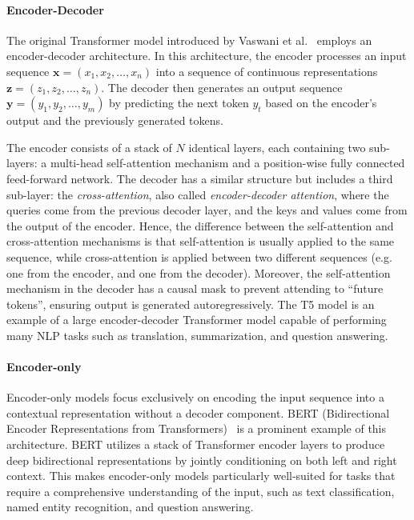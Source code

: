 \paragraph{Encoder-Decoder}
The original Transformer model introduced by Vaswani et al.~\cite{vaswani_attention_2017} employs an encoder-decoder architecture. In this architecture, the encoder processes an input sequence $\mathbf{x} = (x_1, x_2, \dots, x_n)$ into a sequence of continuous representations $\mathbf{z} = (z_1, z_2, \dots, z_n)$. The decoder then generates an output sequence $\mathbf{y} = (y_1, y_2, \dots, y_m)$ by predicting the next token $y_t$ based on the encoder's output and the previously generated tokens.

The encoder consists of a stack of $N$ identical layers, each containing two sub-layers: a multi-head self-attention mechanism and a position-wise fully connected feed-forward network. The decoder has a similar structure but includes a third sub-layer: the \emph{cross-attention}, also called \emph{encoder-decoder attention}, where the queries come from the previous decoder layer, and the keys and values come from the output of the encoder. Hence, the difference between the self-attention and cross-attention mechanisms is that self-attention is usually applied to the same sequence, while cross-attention is applied between two different sequences (e.g. one from the encoder, and one from the decoder). Moreover, the self-attention mechanism in the decoder has a causal mask to prevent attending to ``future tokens'', ensuring output is generated autoregressively. The T5 model \parencite{raffel_exploring_2020} is an example of a large encoder-decoder Transformer model capable of performing many NLP tasks such as translation, summarization, and question answering.

\paragraph{Encoder-only}
Encoder-only models focus exclusively on encoding the input sequence into a contextual representation without a decoder component. BERT (Bidirectional Encoder Representations from Transformers)~\cite{devlin_bert_2019} is a prominent example of this architecture. BERT utilizes a stack of Transformer encoder layers to produce deep bidirectional representations by jointly conditioning on both left and right context. This makes encoder-only models particularly well-suited for tasks that require a comprehensive understanding of the input, such as text classification, named entity recognition, and question answering.

